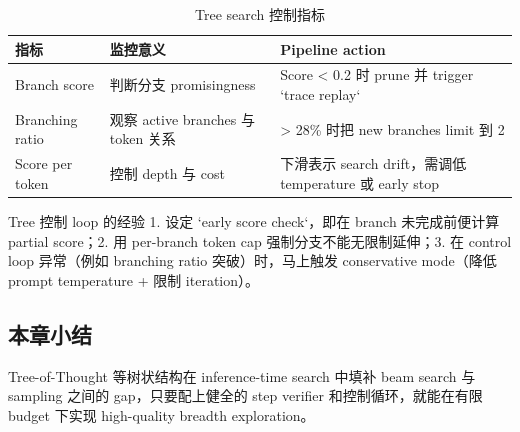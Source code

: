 \begin{table}[H]
\centering
\caption{Tree search 控制指标}
\begin{tabular}{p{}p{}p{}}
\toprule
指标 & 监控意义 & Pipeline action \\
\midrule
Branch score & 判断分支 promisingness & Score < 0.2 时 prune 并 trigger `trace replay` \\
Branching ratio & 观察 active branches 与 token 关系 & > 28\% 时把 new branches limit 到 2 \\
Score per token & 控制 depth 与 cost & 下滑表示 search drift，需调低 temperature 或 early stop \\
\bottomrule
\end{tabular}
\end{table}

\begin{importantbox}{Tree 控制 loop 的经验}
1. 设定 `early score check`，即在 branch 未完成前便计算 partial score；2. 用 per-branch token cap 强制分支不能无限制延伸；3. 在 control loop 异常（例如 branching ratio 突破）时，马上触发 conservative mode（降低 prompt temperature + 限制 iteration）。
\end{importantbox}

\subsection{本章小结}
Tree-of-Thought 等树状结构在 inference-time search 中填补 beam search 与 sampling 之间的 gap，只要配上健全的 step verifier 和控制循环，就能在有限 budget 下实现 high-quality breadth exploration。

